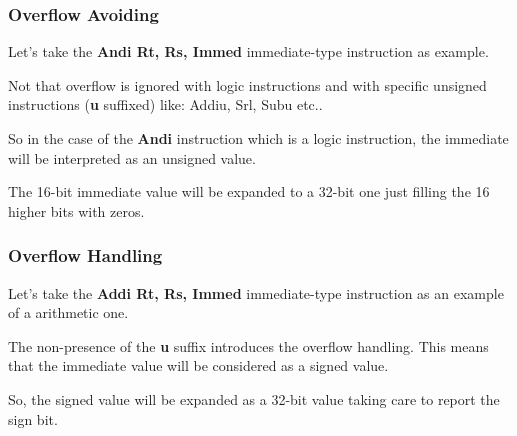 \begin{frame}
  \frametitle{Overflow Avoiding}

  Let's take the \textbf{Andi Rt, Rs, Immed} immediate-type
  instruction as example.

  \nl

  Not that overflow is ignored with logic instructions and with
  specific unsigned instructions (\textbf{u} suffixed) like:
  Addiu, Srl, Subu etc..

  \nl

  So in the case of the \textbf{Andi} instruction which is a logic instruction,
  the immediate will be interpreted as an unsigned value.

  \nl

  The 16-bit immediate value will be expanded to a 32-bit one just
  filling the 16 higher bits with zeros.

  \nl

  \begin{center}
  \end{center}
\end{frame}


\begin{frame}
  \frametitle{Overflow Handling}

  Let's take the \textbf{Addi Rt, Rs, Immed} immediate-type
  instruction as an example of a arithmetic one.

  \nl

  The non-presence of the \textbf{u} suffix introduces the overflow
  handling. This means that the immediate value will be considered
  as a signed value.

  \nl

  So, the signed value will be expanded as a 32-bit value taking care
  to report the sign bit.

  \nl

  \begin{center}
  \end{center}
\end{frame}


